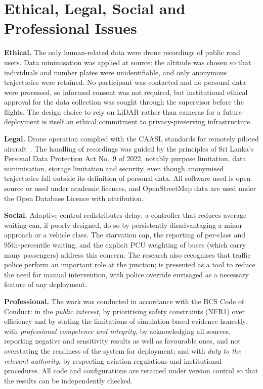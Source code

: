 \section{Ethical, Legal, Social and Professional Issues}\label{sec:method-elsp}

\textbf{Ethical.} The only human-related data were drone recordings of public road users. Data minimisation was applied at source: the altitude was chosen so that individuals and number plates were unidentifiable, and only anonymous trajectories were retained. No participant was contacted and no personal data were processed, so informed consent was not required, but institutional ethical approval for the data collection was sought through the supervisor before the flights. The design choice to rely on LiDAR rather than cameras for a future deployment is itself an ethical commitment to privacy-preserving infrastructure.

\textbf{Legal.} Drone operation complied with the CAASL standards for remotely piloted aircraft~\cite{caasl_drone}. The handling of recordings was guided by the principles of Sri Lanka's Personal Data Protection Act No.~9 of 2022, notably purpose limitation, data minimisation, storage limitation and security, even though anonymised trajectories fall outside its definition of personal data. All software used is open source or used under academic licences, and OpenStreetMap data are used under the Open Database Licence with attribution.

\textbf{Social.} Adaptive control redistributes delay; a controller that reduces average waiting can, if poorly designed, do so by persistently disadvantaging a minor approach or a vehicle class. The starvation cap, the reporting of per-class and 95th-percentile waiting, and the explicit PCU weighting of buses (which carry many passengers) address this concern. The research also recognises that traffic police perform an important role at the junction; \prism{} is presented as a tool to reduce the need for manual intervention, with police override envisaged as a necessary feature of any deployment.

\textbf{Professional.} The work was conducted in accordance with the BCS Code of Conduct: in the \emph{public interest}, by prioritising safety constraints (NFR1) over efficiency and by stating the limitations of simulation-based evidence honestly; with \emph{professional competence and integrity}, by acknowledging all sources, reporting negative and sensitivity results as well as favourable ones, and not overstating the readiness of the system for deployment; and with \emph{duty to the relevant authority}, by respecting aviation regulations and institutional procedures. All code and configurations are retained under version control so that the results can be independently checked.
